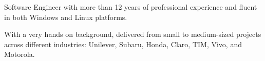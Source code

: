 \par{
Software Engineer with more than 12 years of professional experience and fluent in both Windows and Linux platforms.
}
\par{
With a very hands on background, delivered from small to medium-sized projects across different industries: Unilever, Subaru, Honda, Claro, TIM, Vivo, and Motorola.
}
